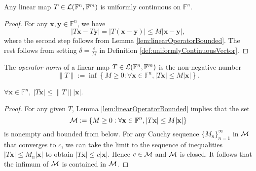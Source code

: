 \begin{coro}
  \label{coro:linearMapIsUniformlyCont}
  Any linear map
  $T\in {\cal L}(\mathbb{F}^n,\mathbb{F}^m)$
  is uniformly continuous on $\mathbb{F}^n$.
\end{coro}
\begin{proof}
  For any $\mathbf{x},\mathbf{y}\in \mathbb{F}^n$,
  we have
  \begin{displaymath}
    |T\mathbf{x} - T\mathbf{y}|
    = |T(\mathbf{x} - \mathbf{y})|
    \le M |\mathbf{x} - \mathbf{y}|,
  \end{displaymath}
  where the second step follows
  from Lemma \ref{lem:linearOperatorBounded}. 
  The rest follows from setting $\delta = \frac{\epsilon}{M}$
  in Definition \ref{def:uniformlyContinuousVector}.
\end{proof}

\begin{defn}
  \label{def:operatorNorm}
  The \emph{operator norm} of a linear map
  \mbox{$T\in {\cal L}(\mathbb{F}^n,\mathbb{F}^m)$}
  is the non-negative number %
  \begin{equation}
    \label{eq:operatorNorm}
    \|T\| := \inf%
    \left\{
      M\ge 0 : \forall \mathbf{x}\in \mathbb{F}^n,
      |T\mathbf{x}| \le M |\mathbf{x}|
    \right\}.
  \end{equation}
\end{defn}

\begin{coro}
  \label{coro:2normLessThanOpNorm}
  $\forall \mathbf{x}\in \mathbb{F}^n,\
  |T\mathbf{x}| \le \|T\||\mathbf{x}|$.
\end{coro}
\begin{proof}
  For any given $T$,
   Lemma \ref{lem:linearOperatorBounded} implies that
   the set
   \begin{displaymath}
     {\cal M}:=\left\{ M\ge 0 : \forall \mathbf{x}\in \mathbb{F}^n,
       |T\mathbf{x}| \le M |\mathbf{x}| \right\}
   \end{displaymath}
  is nonempty and bounded from below.
  For any Cauchy sequence $\{M_n\}_{n=1}^{\infty}$ in ${\cal M}$
  that converges to $c$,
  we can take the limit to the sequence of inequalities
  $|T\mathbf{x}|\le M_n |\mathbf{x}|$
  to obtain $|T\mathbf{x}|\le c |\mathbf{x}|$.
  Hence $c\in {\cal M}$ and ${\cal M}$ is closed.
  It follows that the infimum of ${\cal M}$
  is contained in ${\cal M}$.
\end{proof}

